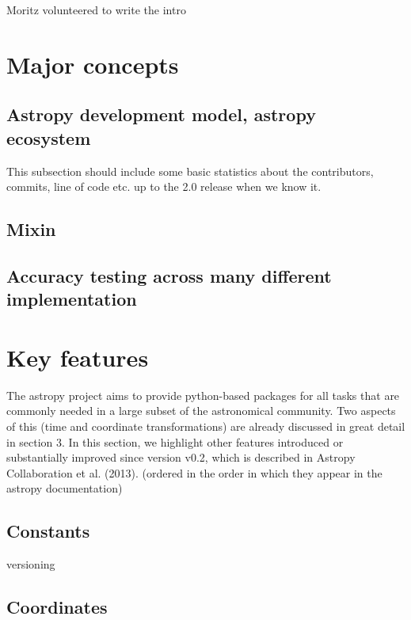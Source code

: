 \documentclass[modern]{aastex61}
\begin{document}
Moritz volunteered to write the intro


\section{Major concepts}
\subsection{Astropy development model, astropy ecosystem}
This subsection should include some basic statistics about the contributors, commits, line of code etc. up to the 2.0 release when we know it.
\subsection{Mixin}
\subsection{Accuracy testing across many different implementation}


\section{Key features}

The astropy project aims to provide python-based packages for all tasks that are commonly needed in a large subset of the astronomical community. Two aspects of this (time and coordinate transformations) are already discussed in great detail in section 3. In this section, we highlight other features introduced or substantially improved since version v0.2, which is described in Astropy Collaboration et al. (2013).
(ordered in the order in which they appear in the astropy documentation)

\subsection{Constants}
versioning 

\subsection{Coordinates}
\end{document}
